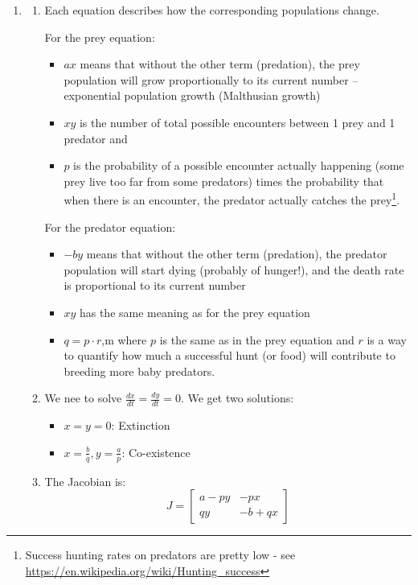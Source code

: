 \begin{enumerate}

\item 
\begin{enumerate}
	\item Each equation describes how the corresponding populations change.

	For the prey equation:
	\begin{itemize}
		\item $ax$ means that without the other term (predation), the prey population will grow proportionally to its current number -- exponential population growth (Malthusian growth)
		\item $xy$ is the number of total possible encounters between 1 prey and 1 predator and
		\item $p$ is the probability of a possible encounter actually happening (some prey live too far from some predators) times the probability that when there is an encounter, the predator actually catches the prey\footnote{Success hunting rates on predators are pretty low - see \url{https://en.wikipedia.org/wiki/Hunting_success}}.
	\end{itemize}
	
	For the predator equation:
	\begin{itemize}
		\item $-by$ means that without the other term (predation), the predator population will start dying (probably of hunger!), and the death rate is proportional to its current number
		\item $xy$ has the same meaning as for the prey equation
		\item $q = p \cdot r$,m where $p$ is the same as in the prey equation and $r$ is a way to quantify how much a successful hunt (or food) will contribute to breeding more baby predators.
	\end{itemize}
	
	
	\item We nee to solve $\frac{dx}{dt} = \frac{dy}{dt} = 0$. We get two solutions:
	\begin{itemize}
		\item $x=y=0$: Extinction
		\item $x=\frac{b}{q}, y = \frac{a}{p}$: Co-existence
	\end{itemize}
	
	\item The Jacobian is:
	\[
	J = \begin{bmatrix}
		a-py & -px \\
		qy & -b+qx
	\end{bmatrix}
	\]
	

\end{enumerate}
\end{enumerate}
